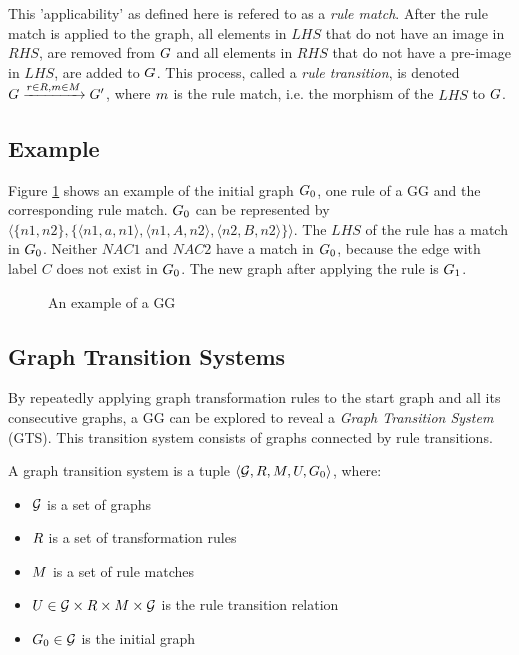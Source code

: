 This 'applicability' as defined here is refered to as a \textit{rule match}. After the rule match is applied to the graph, all elements in $\mathit{LHS}$ that do not have an image in $\mathit{RHS}$, are removed from $G$ and all elements in $\mathit{RHS}$ that do not have a pre-image in $\mathit{LHS}$, are added to $G$. This process, called a \textit{rule transition}, is denoted $G \xrightarrow{r \in R, m \in M}G'$, where $m$ is the rule match, i.e. the morphism of the $\mathit{LHS}$ to $G$.

\subsection{Example}\label{sec:gts_example}
Figure \ref{fig:gg_example} shows an example of the initial graph $G_0$, one rule of a GG and the corresponding rule match. $G_0$ can be represented by $\langle\{n1,n2\},\{\langle n1,a,n1\rangle, \langle n1,A,n2\rangle,\langle n2,B,n2\rangle\}\rangle$. The $\mathit{LHS}$ of the rule has a match in $G_0$. Neither $\mathit{NAC1}$ and $\mathit{NAC2}$ have a match in $G_0$, because the edge with label $C$ does not exist in $G_0$. The new graph after applying the rule is $G_1$.

\begin{figure}[ht]
  \begin{center}
    
  \end{center}
  \caption{An example of a GG}
  \label{fig:gg_example}
\end{figure}

\subsection{Graph Transition Systems}
By repeatedly applying graph transformation rules to the start graph and all its consecutive graphs, a GG can be explored to reveal a \textit{Graph Transition System} (GTS). This transition system consists of graphs connected by rule transitions.
\vspace{5px}
\begin{definition}
A graph transition system is a tuple	$\langle \mathcal{G}, R, M, U, G_0\rangle$, where:
\begin{itemize}
\item $\mathcal{G}$ is a set of graphs
\item $R$ is a set of transformation rules
\item $M$ is a set of rule matches
\item $U \in \mathcal{G} \times R \times M \times \mathcal{G}$ is the rule transition relation
\item $G_0 \in \mathcal{G}$ is the initial graph
\end{itemize}
\end{definition}

